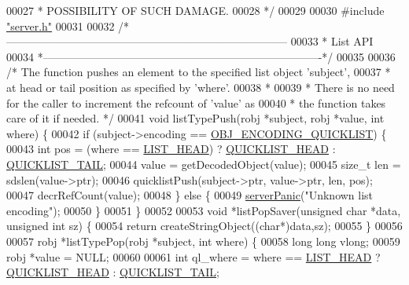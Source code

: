 \begin{DoxyCode}
00027 \textcolor{comment}{ * POSSIBILITY OF SUCH DAMAGE.}
00028 \textcolor{comment}{ */}
00029 
00030 \textcolor{preprocessor}{#}\textcolor{preprocessor}{include} \hyperlink{server_8h}{"server.h"}
00031 
00032 \textcolor{comment}{/*-----------------------------------------------------------------------------}
00033 \textcolor{comment}{ * List API}
00034 \textcolor{comment}{ *----------------------------------------------------------------------------*/}
00035 
00036 \textcolor{comment}{/* The function pushes an element to the specified list object 'subject',}
00037 \textcolor{comment}{ * at head or tail position as specified by 'where'.}
00038 \textcolor{comment}{ *}
00039 \textcolor{comment}{ * There is no need for the caller to increment the refcount of 'value' as}
00040 \textcolor{comment}{ * the function takes care of it if needed. */}
00041 \textcolor{keywordtype}{void} listTypePush(robj *subject, robj *value, \textcolor{keywordtype}{int} where) \{
00042     \textcolor{keywordflow}{if} (subject->encoding == \hyperlink{server_8h_aec792aeed6d4bf83966672e6a23043b8}{OBJ\_ENCODING\_QUICKLIST}) \{
00043         \textcolor{keywordtype}{int} pos = (where == \hyperlink{server_8h_a5fc6a15ca26c6208f66ad2768a3108ef}{LIST\_HEAD}) ? \hyperlink{quicklist_8h_a4cbe05838d62e8d1c8bfa46c9f1b083a}{QUICKLIST\_HEAD} : 
      \hyperlink{quicklist_8h_a602bad1be3a6abb2a66ef87387cb7698}{QUICKLIST\_TAIL};
00044         value = getDecodedObject(value);
00045         size\_t len = sdslen(value->ptr);
00046         quicklistPush(subject->ptr, value->ptr, len, pos);
00047         decrRefCount(value);
00048     \} \textcolor{keywordflow}{else} \{
00049         \hyperlink{server_8h_a11cc378e7778a830b41240578de3b204}{serverPanic}(\textcolor{stringliteral}{"Unknown list encoding"});
00050     \}
00051 \}
00052 
00053 \textcolor{keywordtype}{void} *listPopSaver(\textcolor{keywordtype}{unsigned} \textcolor{keywordtype}{char} *data, \textcolor{keywordtype}{unsigned} \textcolor{keywordtype}{int} sz) \{
00054     \textcolor{keywordflow}{return} createStringObject((\textcolor{keywordtype}{char}*)data,sz);
00055 \}
00056 
00057 robj *listTypePop(robj *subject, \textcolor{keywordtype}{int} where) \{
00058     \textcolor{keywordtype}{long} \textcolor{keywordtype}{long} vlong;
00059     robj *value = NULL;
00060 
00061     \textcolor{keywordtype}{int} ql\_where = where == \hyperlink{server_8h_a5fc6a15ca26c6208f66ad2768a3108ef}{LIST\_HEAD} ? \hyperlink{quicklist_8h_a4cbe05838d62e8d1c8bfa46c9f1b083a}{QUICKLIST\_HEAD} : 
      \hyperlink{quicklist_8h_a602bad1be3a6abb2a66ef87387cb7698}{QUICKLIST\_TAIL};

\end{DoxyCode}

